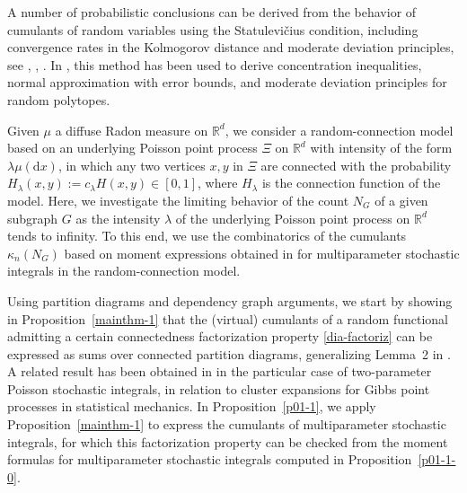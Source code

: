 \documentclass[12pt]{article}
\newcommand{\R}{\mathbb{R}}
\numberwithin{equation}{section}
\begin{document}
\medskip 

 A number of probabilistic conclusions can be derived
 from the behavior of cumulants of random variables using the 
Statulevi\v{c}ius condition, 
 including convergence rates in the Kolmogorov distance
 and moderate deviation principles, see
 \cite{saulis},
 \cite{doring},
 \cite{doering}. 
 In \cite{grotethale18,thale18}, this method has been used to 
 derive concentration inequalities,
 normal approximation with error bounds,
 and moderate deviation principles for random polytopes.
 
\medskip 
 
Given $\mu$ a %
diffuse Radon measure on $\R^d$,
 we consider a random-connection model
 based on an underlying Poisson point process $\Xi$ on $\R^d$
 with intensity of the form $\lambda\mu(\mathrm{d}x)$, in which 
 any two vertices $x,y$ in $\Xi$ are connected
 with the probability $H_\lambda(x,y):= c_\lambda H(x,y) \in [0,1]$,
 where $H_\lambda$ is the connection function of the model. 
 Here, we investigate the limiting behavior
 of the count $N_G$ of a given subgraph $G$
 as the intensity $\lambda$ of the underlying Poisson point process on $\R^d$
 tends to infinity. 
 To this end, we use the combinatorics of the cumulants $\kappa_n(N_G)$ 
 based on moment expressions obtained in \cite{prkhp} for
 multiparameter stochastic integrals in the random-connection model.
 
 \medskip 

Using partition diagrams and dependency graph arguments,
we start by showing in Proposition~\ref{mainthm-1}
that the (virtual) cumulants of a random functional admitting
a certain connectedness factorization property \eqref{dia-factoriz}  
can be expressed as sums over connected partition diagrams, 
 generalizing Lemma~2 in \cite{MalyshevMinlos91}.  
 A related result has been obtained in \cite{jansen}
 in the particular case of two-parameter Poisson stochastic
 integrals, in relation to 
 cluster expansions for Gibbs point processes in statistical
 mechanics. 
 In Proposition~\ref{p01-1}, we apply Proposition~\ref{mainthm-1} 
 to express the cumulants of multiparameter stochastic integrals,
 for which this factorization property can be checked from 
 the moment formulas for 
 multiparameter stochastic integrals computed in Proposition~\ref{p01-1-0}. 
 
\end{document}
